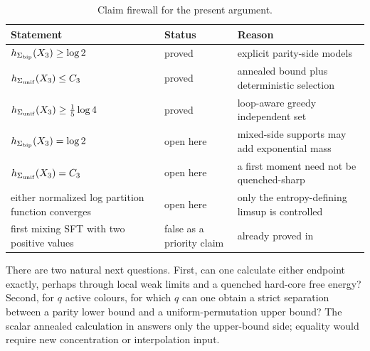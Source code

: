 \begin{table}[ht]
\centering
\caption{Claim firewall for the present argument.}\label{tab:firewall}
\begin{tabularx}{\textwidth}{@{}>{\raggedright\arraybackslash}p{}
>{\raggedright\arraybackslash}p{}Y@{}}
\toprule
Statement & Status & Reason\\
\midrule
$h_{\Sigma_{\mathrm{bip}}}(X_3)\ge\log2$ & proved & explicit parity-side models\\
$h_{\Sigma_{\mathrm{unif}}}(X_3)\le C_3$ & proved & annealed bound plus deterministic selection\\
$h_{\Sigma_{\mathrm{unif}}}(X_3)\ge\frac15\log4$ & proved & loop-aware greedy independent set\\
$h_{\Sigma_{\mathrm{bip}}}(X_3)=\log2$ & open here & mixed-side supports may add exponential mass\\
$h_{\Sigma_{\mathrm{unif}}}(X_3)=C_3$ & open here & a first moment need not be quenched-sharp\\
either normalized log partition function converges & open here & only the entropy-defining limsup is controlled\\
first mixing SFT with two positive values & false as a priority claim & already proved in \citep{AireyBowenLin2022}\\
\bottomrule
\end{tabularx}
\end{table}

There are two natural next questions.  First, can one calculate either
endpoint exactly, perhaps through local weak limits and a quenched hard-core
free energy?  Second, for $q$ active colours, for which $q$ can one obtain a
strict separation between a parity lower bound and a uniform-permutation
upper bound?  The scalar annealed calculation in  answers
only the upper-bound side; equality would require new concentration or
interpolation input.
